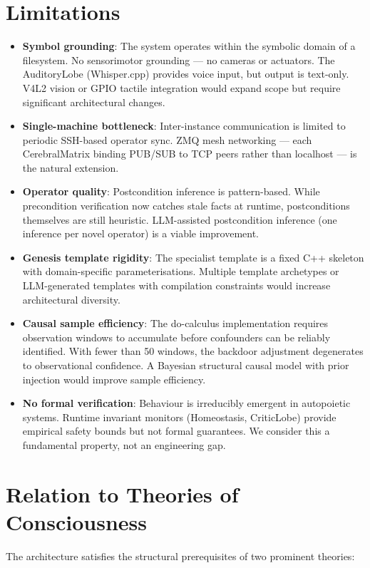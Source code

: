 \documentclass[12pt,a4paper]{report}
\begin{document}
\section{Limitations}
\begin{itemize}
    \item \textbf{Symbol grounding}: The system operates within the symbolic domain of a filesystem. No sensorimotor grounding --- no cameras or actuators. The AuditoryLobe (Whisper.cpp) provides voice input, but output is text-only. V4L2 vision or GPIO tactile integration would expand scope but require significant architectural changes.
    \item \textbf{Single-machine bottleneck}: Inter-instance communication is limited to periodic SSH-based operator sync. ZMQ mesh networking --- each CerebralMatrix binding PUB/SUB to TCP peers rather than localhost --- is the natural extension.
    \item \textbf{Operator quality}: Postcondition inference is pattern-based. While precondition verification now catches stale facts at runtime, postconditions themselves are still heuristic. LLM-assisted postcondition inference (one inference per novel operator) is a viable improvement.
    \item \textbf{Genesis template rigidity}: The specialist template is a fixed C++ skeleton with domain-specific parameterisations. Multiple template archetypes or LLM-generated templates with compilation constraints would increase architectural diversity.
    \item \textbf{Causal sample efficiency}: The do-calculus implementation requires observation windows to accumulate before confounders can be reliably identified. With fewer than 50 windows, the backdoor adjustment degenerates to observational confidence. A Bayesian structural causal model with prior injection would improve sample efficiency.
    \item \textbf{No formal verification}: Behaviour is irreducibly emergent in autopoietic systems. Runtime invariant monitors (Homeostasis, CriticLobe) provide empirical safety bounds but not formal guarantees. We consider this a fundamental property, not an engineering gap.
\end{itemize}


\section{Relation to Theories of Consciousness}
The architecture satisfies the structural prerequisites of two prominent theories:
\end{document}
